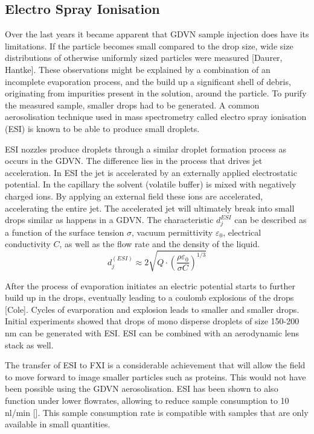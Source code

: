 \subsection{Electro Spray Ionisation}
Over the last years it became apparent that GDVN sample injection does have its limitations. If the particle becomes small compared to the drop size, wide size distributions of otherwise uniformly sized particles were measured [Daurer, Hantke]. These observations might be explained by a combination of an incomplete evaporation process, and the build up a significant shell of debris, originating from impurities present in the solution, around the particle. To purify the measured sample, smaller drops had to be generated. A common aerosolisation technique used in mass spectrometry called electro spray ionisation (ESI) is known to be able to produce small droplets.

ESI nozzles produce droplets through a similar droplet formation process as occurs in the GDVN. The difference lies in the process that drives jet acceleration. In ESI the jet is accelerated by an externally applied electrostatic potential. In the capillary the solvent (volatile buffer) is mixed with negatively charged ions. By applying an external field these ions are accelerated, accelerating the entire jet. The accelerated jet will ultimately break into small drops similar as happens in a GDVN. The characteristic $d_j^{ESI}$ can be described as a function of the surface tension $\sigma$, vacuum permittivity $\varepsilon_0$, electrical conductivity $C$, as well as the flow rate and the density of the liquid.
\begin{equation}
d_j^{(ESI)} \approx 2 \sqrt{Q \cdot \left(\frac{\rho \varepsilon_0}{\sigma C}\right)^{1/3}}
\end{equation}

After the process of evaporation initiates an electric potential starts to further build up in the drops, eventually leading to a coulomb explosions of the drops [Cole]. Cycles of evarporation and explosion leads to smaller and smaller drops. Initial experiments showed that drops of mono disperse droplets of size 150-200 nm can be generated with ESI. ESI can be combined with an aerodynamic lens stack as well. 

The transfer of ESI to FXI is a considerable achievement that will allow the field to move forward to image smaller particles such as proteins. This would not have been possible using the GDVN aerosolisation. ESI has been shown to also function under lower flowrates, allowing to reduce sample consumption to 10 nl/min []. This sample consumption rate is compatible with samples that are only available in small quantities. 

